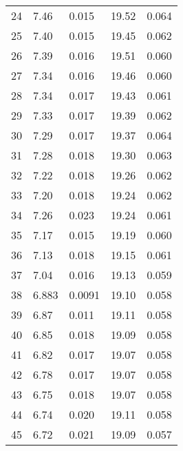 \begin{table}
\begin{tabular}{c|ll|ll}
24 & 7.46 & 0.015 & 19.52 & 0.064 \\
25 & 7.40 & 0.015 & 19.45 & 0.062 \\
26 & 7.39 & 0.016 & 19.51 & 0.060 \\
27 & 7.34 & 0.016 & 19.46 & 0.060 \\
28 & 7.34 & 0.017 & 19.43 & 0.061 \\
29 & 7.33 & 0.017 & 19.39 & 0.062 \\
30 & 7.29 & 0.017 & 19.37 & 0.064 \\
31 & 7.28 & 0.018 & 19.30 & 0.063 \\
32 & 7.22 & 0.018 & 19.26 & 0.062 \\
33 & 7.20 & 0.018 & 19.24 & 0.062 \\
34 & 7.26 & 0.023 & 19.24 & 0.061 \\
35 & 7.17 & 0.015 & 19.19 & 0.060 \\
36 & 7.13 & 0.018 & 19.15 & 0.061 \\
37 & 7.04 & 0.016 & 19.13 & 0.059 \\
38 & 6.883 & 0.0091 & 19.10 & 0.058 \\
39 & 6.87 & 0.011 & 19.11 & 0.058 \\
40 & 6.85 & 0.018 & 19.09 & 0.058 \\
41 & 6.82 & 0.017 & 19.07 & 0.058 \\
42 & 6.78 & 0.017 & 19.07 & 0.058 \\
43 & 6.75 & 0.018 & 19.07 & 0.058 \\
44 & 6.74 & 0.020 & 19.11 & 0.058 \\
45 & 6.72 & 0.021 & 19.09 & 0.057 \\
               \hline
        \end{tabular}
    \end{table}
    \clearpage
